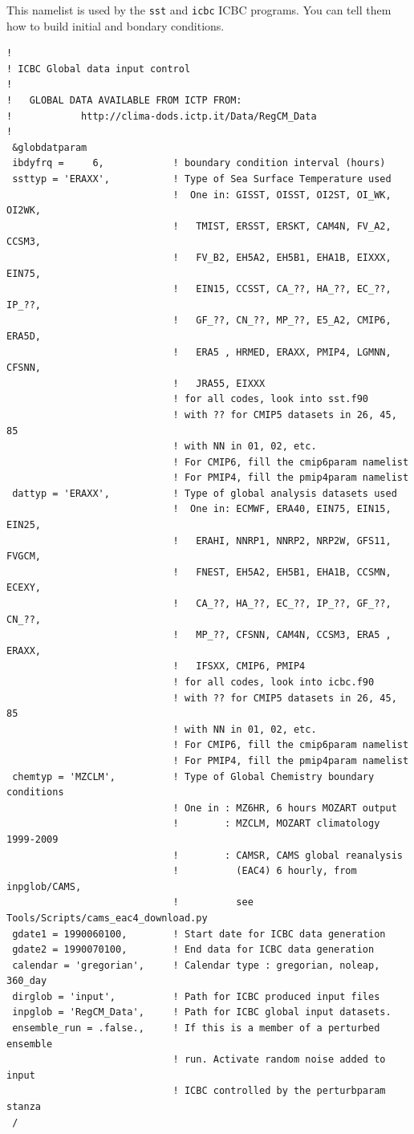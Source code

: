 This namelist is used by the \verb=sst= and \verb=icbc= ICBC programs. You can
tell them how to build initial and bondary conditions.

{\footnotesize
\begin{Verbatim}
!
! ICBC Global data input control
!
!   GLOBAL DATA AVAILABLE FROM ICTP FROM:
!            http://clima-dods.ictp.it/Data/RegCM_Data
!
 &globdatparam
 ibdyfrq =     6,            ! boundary condition interval (hours)
 ssttyp = 'ERAXX',           ! Type of Sea Surface Temperature used
                             !  One in: GISST, OISST, OI2ST, OI_WK, OI2WK,
                             !   TMIST, ERSST, ERSKT, CAM4N, FV_A2, CCSM3,
                             !   FV_B2, EH5A2, EH5B1, EHA1B, EIXXX, EIN75,
                             !   EIN15, CCSST, CA_??, HA_??, EC_??, IP_??,
                             !   GF_??, CN_??, MP_??, E5_A2, CMIP6, ERA5D,
                             !   ERA5 , HRMED, ERAXX, PMIP4, LGMNN, CFSNN,
                             !   JRA55, EIXXX
                             ! for all codes, look into sst.f90
                             ! with ?? for CMIP5 datasets in 26, 45, 85
                             ! with NN in 01, 02, etc.
                             ! For CMIP6, fill the cmip6param namelist
                             ! For PMIP4, fill the pmip4param namelist
 dattyp = 'ERAXX',           ! Type of global analysis datasets used
                             !  One in: ECMWF, ERA40, EIN75, EIN15, EIN25,
                             !   ERAHI, NNRP1, NNRP2, NRP2W, GFS11, FVGCM,
                             !   FNEST, EH5A2, EH5B1, EHA1B, CCSMN, ECEXY,
                             !   CA_??, HA_??, EC_??, IP_??, GF_??, CN_??,
                             !   MP_??, CFSNN, CAM4N, CCSM3, ERA5 , ERAXX,
                             !   IFSXX, CMIP6, PMIP4
                             ! for all codes, look into icbc.f90
                             ! with ?? for CMIP5 datasets in 26, 45, 85
                             ! with NN in 01, 02, etc.
                             ! For CMIP6, fill the cmip6param namelist
                             ! For PMIP4, fill the pmip4param namelist
 chemtyp = 'MZCLM',          ! Type of Global Chemistry boundary conditions
                             ! One in : MZ6HR, 6 hours MOZART output
                             !        : MZCLM, MOZART climatology 1999-2009
                             !        : CAMSR, CAMS global reanalysis
                             !          (EAC4) 6 hourly, from inpglob/CAMS,
                             !          see Tools/Scripts/cams_eac4_download.py
 gdate1 = 1990060100,        ! Start date for ICBC data generation
 gdate2 = 1990070100,        ! End data for ICBC data generation
 calendar = 'gregorian',     ! Calendar type : gregorian, noleap, 360_day
 dirglob = 'input',          ! Path for ICBC produced input files
 inpglob = 'RegCM_Data',     ! Path for ICBC global input datasets.
 ensemble_run = .false.,     ! If this is a member of a perturbed ensemble
                             ! run. Activate random noise added to input
                             ! ICBC controlled by the perturbparam stanza
 /
\end{Verbatim}
}

